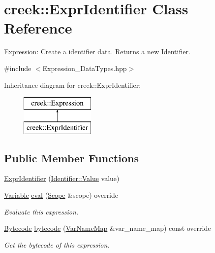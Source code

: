 \hypertarget{classcreek_1_1_expr_identifier}{}\section{creek\+:\+:Expr\+Identifier Class Reference}
\label{classcreek_1_1_expr_identifier}


\hyperlink{classcreek_1_1_expression}{Expression}\+: Create a identifier data. Returns a new {\ttfamily \hyperlink{classcreek_1_1_identifier}{Identifier}}.  




{\ttfamily \#include $<$Expression\+\_\+\+Data\+Types.\+hpp$>$}

Inheritance diagram for creek\+:\+:Expr\+Identifier\+:\begin{figure}[H]
\begin{center}
\leavevmode
\includegraphics[height=2.000000cm]{classcreek_1_1_expr_identifier}
\end{center}
\end{figure}
\subsection*{Public Member Functions}
\begin{DoxyCompactItemize}
\item 
\hyperlink{classcreek_1_1_expr_identifier_abcd8ce58f7ea6b03c20fbc0337556a8e}{Expr\+Identifier} (\hyperlink{classcreek_1_1_identifier_afb560a4cce99e96c30092edbd22a5ef4}{Identifier\+::\+Value} value)
\item 
\hyperlink{classcreek_1_1_variable}{Variable} \hyperlink{classcreek_1_1_expr_identifier_acb9cc26579b3dc0cd08f76685222df93}{eval} (\hyperlink{classcreek_1_1_scope}{Scope} \&scope) override
\begin{DoxyCompactList}\small\item\em Evaluate this expression. \end{DoxyCompactList}\item 
\hyperlink{classcreek_1_1_bytecode}{Bytecode} \hyperlink{classcreek_1_1_expr_identifier_a749f8b0d36a805c7a28d0c1acd737315}{bytecode} (\hyperlink{classcreek_1_1_var_name_map}{Var\+Name\+Map} \&var\+\_\+name\+\_\+map) const  override\hypertarget{classcreek_1_1_expr_identifier_a749f8b0d36a805c7a28d0c1acd737315}{}\label{classcreek_1_1_expr_identifier_a749f8b0d36a805c7a28d0c1acd737315}

\begin{DoxyCompactList}\small\item\em Get the bytecode of this expression. \end{DoxyCompactList}\end{DoxyCompactItemize}


